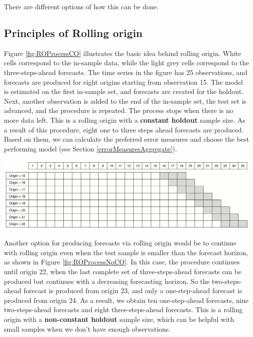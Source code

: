 \documentclass[
]{book}
\theoremstyle{definition}
\theoremstyle{definition}
\theoremstyle{definition}
\theoremstyle{definition}
\theoremstyle{remark}
\begin{document}
There are different options of how this can be done.

\hypertarget{principles-of-rolling-origin}{%
\subsection{Principles of Rolling origin}\label{principles-of-rolling-origin}}

Figure \ref{fig:ROProcessCO} \citep{Svetunkov2017} illustrates the basic idea behind rolling origin. White cells correspond to the in-sample data, while the light grey cells correspond to the three-steps-ahead forecasts. The time series in the figure has 25 observations, and forecasts are produced for eight origins starting from observation 15. The model is estimated on the first in-sample set, and forecasts are created for the holdout. Next, another observation is added to the end of the in-sample set, the test set is advanced, and the procedure is repeated. The process stops when there is no more data left. This is a rolling origin with a \textbf{constant holdout} sample size. As a result of this procedure, eight one to three steps ahead forecasts are produced. Based on them, we can calculate the preferred error measures and choose the best performing model (see Section \ref{errorMeasuresAggregate}).

\includegraphics{./images/03-ROProcessCO.jpg}

Another option for producing forecasts via rolling origin would be to continue with rolling origin even when the test sample is smaller than the forecast horizon, as shown in Figure \ref{fig:ROProcessNoCO}. In this case, the procedure continues until origin 22, when the last complete set of three-steps-ahead forecasts can be produced but continues with a decreasing forecasting horizon. So the two-steps-ahead forecast is produced from origin 23, and only a one-step-ahead forecast is produced from origin 24. As a result, we obtain ten one-step-ahead forecasts, nine two-steps-ahead forecasts and eight three-steps-ahead forecasts. This is a rolling origin with a \textbf{non-constant holdout} sample size, which can be helpful with small samples when we don't have enough observations.
\end{document}
